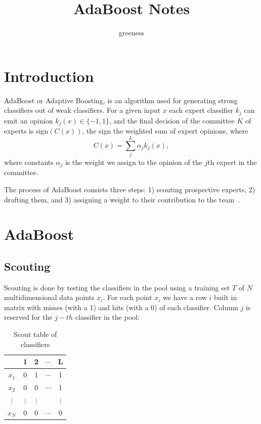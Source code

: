 \documentclass[]{article}  %
\begin{document}
\title{AdaBoost Notes}   %
\author{greeness}         %
\maketitle
\setcounter{tocdepth}{2}

\tableofcontents
\newpage
{}


\section{Introduction}

AdaBoost or Adaptive Boosting, is an algorithm used for generating strong classifiers out of weak classifiers. For a given input $x$ each expert classifier $k_j$ can emit an opinion $k_j(x)\in \{-1,1\}$, and the final decision of the committee $K$ of experts is sign$(C(x))$, the sign the weighted sum of expert opinions, where
\[
C(x) = \sum_j^L \alpha_j k_j (x),
\]
where constants $\alpha_j$ is the weight we assign to the opinion of the $j$th expert in the committee. 

The process of AdaBoost consists three steps: 1) scouting prospective experts, 2) drafting them, and 3) assigning a weight to their contribution to the team~\cite{tutorial}.

\section{AdaBoost}

\subsection{Scouting}

Scouting is done by testing the classifiers in the pool using a training set $T$ of $N$ multidimensional data points $x_i$. For each point $x_i$ we have a row $i$ built in matrix with misses (with a 1) and hits (with a 0) of each classifier. Column $j$ is reserved for the $j-th$ classifier in the pool:

\begin{table}[htdp]
\caption{Scout table of classifiers}
\begin{center}
\begin{tabular}{c|cccc}
 & 1 & 2 & $\cdots$ & L\\
 \hline
$x_1$ & 0 & 1 & $\cdots$ & 1\\
$x_2$ & 0 & 0 & $\cdots$ & 1\\
$\vdots$ & $\vdots$ & $\vdots$ &  & $\vdots$ \\
$x_N$ & 0 & 0 & $\cdots$ & 0
\end{tabular}
\end{center}
\label{default}
\end{table}%
\end{document}
